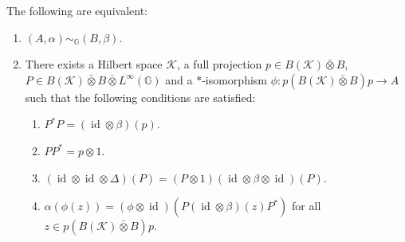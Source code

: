 \documentclass[10pt,a4paper]{amsart}
\DeclareMathOperator{\id}{\mathrm{id}}
\newcommand{\G}{\mathbb{G}}
\newcommand{\ovot}{\bar{\otimes}}
\begin{document}
\begin{Theorem}\label{char2} The following are equivalent:
      \begin{enumerate}\setlength\itemsep{-0.5em}
        \item $(A, \alpha)\sim_\G (B, \beta)$.
        \item There exists a Hilbert space $\mathcal{K}$, a full projection $p\in B(\mathcal{K})\ovot B$, $P\in B(\mathcal{K})\ovot B \ovot L^\infty(\G)$ and a $*$-isomorphism $\phi: p(B(\mathcal{K})\ovot B)p\to A$ such that the following conditions are satisfied:
    \begin{enumerate}\setlength\itemsep{-0.5em}
        \item $P^*P=(\id \otimes \beta)(p)$.
        \item $PP^* = p\otimes 1$.
        \item $(\id \otimes \id \otimes \Delta)(P) = (P\otimes 1)(\id \otimes \beta \otimes \id)(P).$
        \item $\alpha(\phi(z)) = (\phi\otimes \id)(P(\id \otimes \beta)(z)P^*)$ for all $z\in p(B(\mathcal{K})\ovot B)p.$
    \end{enumerate}
    \end{enumerate}
\end{Theorem}
\end{document}

